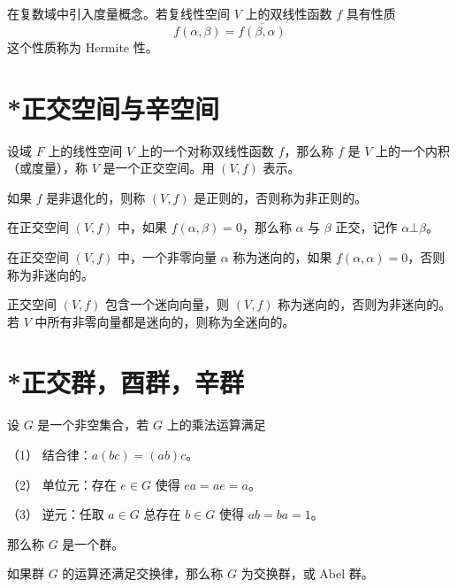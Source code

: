 在复数域中引入度量概念。若复线性空间 $V$ 上的双线性函数 $f$ 具有性质
\[ f(\alpha,\beta) = \overline{f(\beta,\alpha)} \]
这个性质称为 Hermite 性。

\section{*正交空间与辛空间}

\begin{definition}
    设域 $F$ 上的线性空间 $V$ 上的一个对称双线性函数 $f$，那么称 $f$ 是 $V$ 上的一个内积（或度量），称 $V$ 是一个正交空间。用 $(V,f)$ 表示。
\end{definition}

如果 $f$ 是非退化的，则称 $(V,f)$ 是正则的，否则称为非正则的。

\begin{definition}
    在正交空间 $(V,f)$ 中，如果 $f(\alpha,\beta) = 0$，那么称 $\alpha$ 与 $\beta$ 正交，记作 $\alpha \bot \beta$。
\end{definition}

在正交空间 $(V,f)$ 中，一个非零向量 $\alpha$ 称为迷向的，如果 $f(\alpha,\alpha) = 0$，否则称为非迷向的。

正交空间 $(V,f)$ 包含一个迷向向量，则 $(V,f)$ 称为迷向的，否则为非迷向的。若 $V$ 中所有非零向量都是迷向的，则称为全迷向的。

\section{*正交群，酉群，辛群}

\begin{definition}
    设 $G$ 是一个非空集合，若 $G$ 上的乘法运算满足

    （1） 结合律：$a(bc) = (ab)c$。

    （2） 单位元：存在 $e \in G$ 使得 $ea = ae = a$。

    （3） 逆元：任取 $a \in G$ 总存在 $b \in G$ 使得 $ab = ba = 1$。

    那么称 $G$ 是一个群。
\end{definition}

如果群 $G$ 的运算还满足交换律，那么称 $G$ 为交换群，或 Abel 群。











